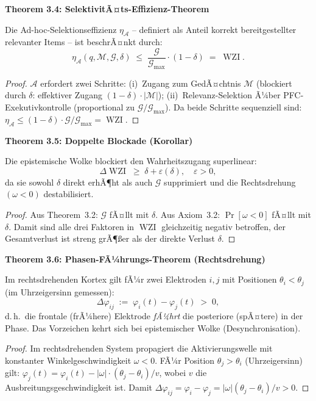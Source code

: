 ﻿\documentclass[12pt,a4paper]{report}
\theoremstyle{plain}
\theoremstyle{definition}
\theoremstyle{remark}
\DeclareMathOperator{\WZI}{WZI}
\begin{document}
	
	\noindent\textbf{Theorem 3.4: SelektivitÃ¤ts-Effizienz-Theorem}

		\label{thm:selektion}
		Die Ad-hoc-Selektionseffizienz $\eta_{\mathcal{A}}$ -- definiert als
		Anteil korrekt bereitgestellter relevanter Items -- ist beschrÃ¤nkt durch:
		\[
		\eta_{\mathcal{A}}(q, \mathcal{M}, \mathcal{G}, \delta)
		\;\leq\;
		\frac{\mathcal{G}}{\mathcal{G}_{\max}} \cdot (1-\delta)
		\;=\; \WZI.
		\]

	
	\begin{proof}
		$\mathcal{A}$ erfordert zwei Schritte: (i)~Zugang zum GedÃ¤chtnis $\mathcal{M}$
		(blockiert durch $\delta$: effektiver Zugang $(1-\delta)\cdot|\mathcal{M}|$);
		(ii)~Relevanz-Selektion Ã¼ber PFC-Exekutivkontrolle (proportional zu $\mathcal{G}/\mathcal{G}_{\max}$).
		Da beide Schritte sequenziell sind:
		$\eta_{\mathcal{A}} \leq (1-\delta) \cdot \mathcal{G}/\mathcal{G}_{\max} = \WZI$. 
	\end{proof}
	
	
	\noindent\textbf{Theorem 3.5: Doppelte Blockade (Korollar)}

		Die epistemische Wolke blockiert den Wahrheitszugang superlinear:
		\[
		\Delta\WZI \;\geq\; \delta + \varepsilon(\delta), \quad \varepsilon > 0,
		\]
		da sie sowohl $\delta$ direkt erhÃ¶ht als auch $\mathcal{G}$ supprimiert
		und die Rechtsdrehung $(\omega < 0)$ destabilisiert.

	
	\begin{proof}
		Aus Theorem~3.2: $\mathcal{G}$ fÃ¤llt mit $\delta$.
		Aus Axiom~3.2: $\Pr[\omega < 0]$ fÃ¤llt mit $\delta$.
		Damit sind alle drei Faktoren in $\WZI$ gleichzeitig negativ betroffen,
		der Gesamtverlust ist streng grÃ¶\ss{}er als der direkte Verlust $\delta$. 
	\end{proof}
	
	
	\noindent\textbf{Theorem 3.6: Phasen-FÃ¼hrungs-Theorem (Rechtsdrehung)}

		\label{thm:phasenfuehr}
		Im rechtsdrehenden Kortex gilt fÃ¼r zwei Elektroden $i, j$
		mit Positionen $\theta_i < \theta_j$ (im Uhrzeigersinn gemessen):
		\[
		\Delta\varphi_{ij} \;:=\; \varphi_i(t) - \varphi_j(t) \;>\; 0,
		\]
		d.\,h.\ die frontale (frÃ¼here) Elektrode \emph{fÃ¼hrt} die
		posteriore (spÃ¤tere) in der Phase. Das Vorzeichen kehrt sich bei
		epistemischer Wolke (Desynchronisation).

	
	\begin{proof}
		Im rechtsdrehenden System propagiert die Aktivierungswelle mit konstanter
		Winkelgeschwindigkeit $\omega < 0$.
		FÃ¼r Position $\theta_j > \theta_i$ (Uhrzeigersinn) gilt:
		$\varphi_j(t) = \varphi_i(t) - |\omega|\cdot(\theta_j - \theta_i)/v$,
		wobei $v$ die Ausbreitungsgeschwindigkeit ist.
		Damit $\Delta\varphi_{ij} = \varphi_i - \varphi_j = |\omega|(\theta_j-\theta_i)/v > 0$. 
	\end{proof}
	
\end{document}
